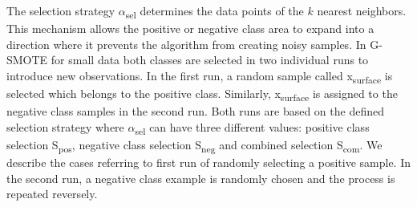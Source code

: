 \documentclass[parskip=full]{scrartcl}
\begin{document}
The selection strategy $\alpha$\textsubscript{sel} determines the data points 
of the $\mathit{k}$ nearest neighbors. This mechanism allows the positive or 
negative class area to expand into a direction where it prevents the algorithm 
from creating noisy samples. In G-SMOTE for small data both classes are 
selected in two individual runs to introduce new observations. In the first 
run, a random sample called x\textsubscript{surface} is selected which belongs 
to the positive class. Similarly, x\textsubscript{surface} is assigned to the 
negative class samples in the second run. Both runs are based on the defined 
selection strategy where $\alpha$\textsubscript{sel} can have three different 
values: positive class selection S\textsubscript{pos}, negative class selection 
S\textsubscript{neg} and combined selection S\textsubscript{com}. We describe 
the cases referring to first run of randomly selecting a positive sample. In 
the second run, a negative class example is randomly chosen and the process is 
repeated reversely. 
\end{document}
